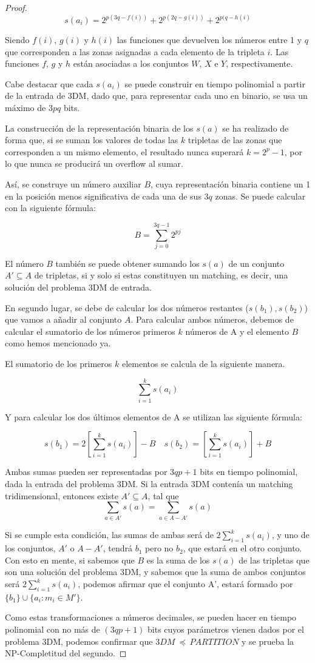 \documentclass[11pt, a4paper, oneside]{memoir}
\begin{document}
\begin{proof}
\[ s(a_i) = 2^{p(3q - f(i))} + 2^{p(2q - g(i))} + 2^{p(q - h(i)} \]

Siendo $f(i)$, $g(i)$ y $h(i)$ las funciones que devuelven los números entre 1 y $q$ que corresponden a las zonas asignadas a cada elemento de la tripleta $i$. Las funciones $f$, $g$ y $h$ están asociadas a los conjuntos $W$, $X$ e $Y$, respectivamente.

Cabe destacar que cada $s(a_i)$ se puede construir en tiempo polinomial a partir de la entrada de 3DM, dado que, para representar cada uno en binario, se usa un máximo de $3pq$ bits.

La construcción de la representación binaria de los $s(a)$ se ha realizado de forma que, si se suman los valores de todas las $k$ tripletas de las zonas que corresponden a un mismo elemento, el resultado nunca superará $k = 2^p - 1$, por lo que nunca se producirá un overflow al sumar. 

Así, se construye un número auxiliar $B$, cuya representación binaria contiene un 1 en la posición menos significativa de cada una de sus $3q$ zonas. Se puede calcular con la siguiente fórmula:

\[ B = \sum_{j = 0}^{3q - 1} 2^{pj}\]

El número $B$ también se puede obtener sumando los $s(a)$ de un conjunto $A' \subseteq A$ de tripletas, si y solo si estas constituyen un matching, es decir, una solución del problema 3DM de entrada. 

En segundo lugar, se debe de calcular los dos números restantes ($s(b_1), s(b_2)$) que vamos a añadir al conjunto $A$.
Para calcular ambos números, debemos de calcular el sumatorio de los números primeros $k$ números de A y el elemento $B$ como hemos mencionado ya.

El sumatorio de los primeros $k$ elementos se calcula de la siguiente manera.

\[\sum_{i=1}^{k}s(a_{i})\]

Y para calcular los dos últimos elementos de A se utilizan las siguiente fórmula:

\[ s(b_1) = 2 \left[\sum_{i=1}^{k}s(a_{i})\right] - B \quad s(b_2) = \left[\sum_{i=1}^{k}s(a_{i})\right] + B\]

Ambas sumas pueden ser representadas por $3qp + 1$ bits en tiempo polinomial, dada la entrada del problema 3DM.
Si la entrada 3DM contenía un matching tridimensional, entonces existe \(A' \subseteq A\), tal que \[ \sum_{a\in A'}s(a)= \sum_{a\in A - A'}s(a)\]

Si se cumple esta condición, las sumas de ambas será de \(2\sum_{i=1}^{k}s(a_{i})\), y uno de los conjuntos, $A'$ o $A-A'$, tendrá $b_1$ pero no $b_2$, que estará en el otro conjunto. Con esto en mente, si sabemos que $B$ es la suma de los $s(a)$ de las tripletas que son una solución del problema 3DM, y sabemos que la suma de ambos conjuntos será \(2\sum_{i=1}^{k}s(a_{i})\), podemos afirmar que el conjunto A', estará formado por \(\{b_1\} \cup \{a_i : m_i \in M'\}\).
\newline

Como estas transformaciones a números decimales, se pueden hacer en tiempo polinomial con no más de $(3qp + 1)$ bits cuyos parámetros vienen dados por el problema 3DM, podemos confirmar que  \(3DM \ \preceq \ PARTITION\) y se prueba la NP-Completitud del segundo. 
\end{proof}
\end{document}

